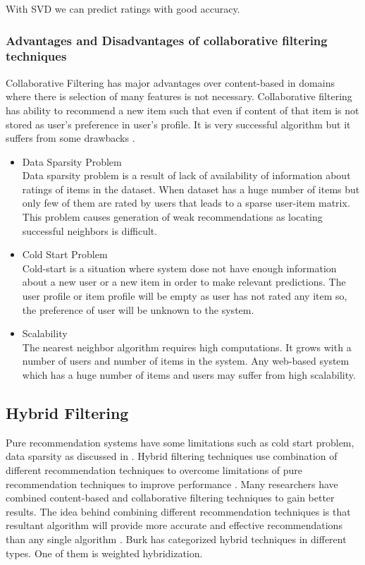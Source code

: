 \noindent With SVD we can predict ratings with good accuracy.

\subsubsection{Advantages and Disadvantages of collaborative filtering techniques}
\label{cf_pros_cons}
Collaborative Filtering has major advantages over content-based in domains where there is selection of many features is not necessary. Collaborative filtering has ability to recommend a new item such that even if content of that item is not stored as user's preference in user's profile. It is very successful algorithm but it suffers from some drawbacks \cite{10}.
\\
\begin{itemize}
\item Data Sparsity Problem \\
Data sparsity problem is a result of lack of availability of information about ratings of items in the dataset. When dataset has a huge number of items but only few of them are rated by users that leads to a sparse user-item matrix. This problem causes generation of weak recommendations as locating successful neighbors is difficult.
\item Cold Start Problem \\
Cold-start is a situation where system dose not have enough information about a new user or a new item in order to make relevant predictions. The user profile or item profile will be empty as user has not rated any item so, the preference of user will be unknown to the system.
\item Scalability \\
The nearest neighbor algorithm requires high computations. It grows with a number of users and number of items in the system. Any web-based system which has a huge number of items and users may suffer from high scalability.

\end{itemize}

\subsection{Hybrid Filtering}
Pure recommendation systems have some limitations such as cold start problem, data sparsity as discussed in . Hybrid filtering techniques use combination of different recommendation techniques to overcome limitations of pure recommendation techniques to improve performance \cite{37,38}. Many researchers have combined content-based and collaborative filtering techniques to gain better results. The idea behind combining different recommendation techniques is that resultant algorithm will provide more accurate and effective recommendations than any single algorithm \cite{39}. Burk \cite{40} has categorized hybrid techniques in different types. One of them is weighted hybridization.\\

